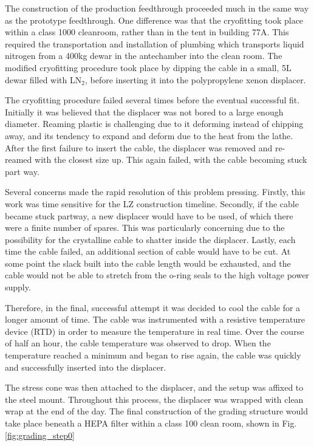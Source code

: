 The construction of the production feedthrough proceeded much in the same way as the prototype feedthrough.
One difference was that the cryofitting took place within a class 1000 cleanroom, rather than in the tent in building 77A.
This required the transportation and installation of plumbing which transports liquid nitrogen from a 400kg dewar in the antechamber into the clean room.
The modified cryofitting procedure took place by dipping the cable in a small, 5L dewar filled with LN$_2$, before inserting it into the polypropylene xenon displacer.

The cryofitting procedure failed several times before the eventual successful fit.
Initially it was believed that the displacer was not bored to a large enough diameter.
Reaming plastic is challenging due to it deforming instead of chipping away, and its tendency to expand and deform due to the heat from the lathe.
After the first failure to insert the cable, the displacer was removed and re-reamed with the closest size up.
This again failed, with the cable becoming stuck part way.

Several concerns made the rapid resolution of this problem pressing.
Firstly, this work was time sensitive for the LZ construction timeline.
Secondly, if the cable became stuck partway, a new displacer would have to be used, of which there were a finite number of spares.
This was particularly concerning due to the possibility for the crystalline cable to shatter inside the displacer.
Lastly, each time the cable failed, an additional section of cable would have to be cut. 
At some point the slack built into the cable length would be exhausted, and the cable would not be able to stretch from the o-ring seals to the high voltage power supply.

Therefore, in the final, successful attempt it was decided to cool the cable for a longer amount of time.
The cable was instrumented with a resistive temperature device (RTD) in order to measure the temperature in real time.
Over the course of half an hour, the cable temperature was observed to drop.
When the temperature reached a minimum and began to rise again, the cable was quickly and successfully inserted into the displacer.

The stress cone was then attached to the displacer, and the setup was affixed to the steel mount.
Throughout this process, the displacer was wrapped with clean wrap at the end of the day.
The final construction of the grading structure would take place beneath a HEPA filter within a class 100 clean room, shown in Fig. \ref{fig:grading_step0}

